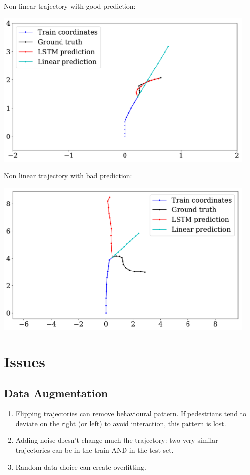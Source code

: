 \documentclass[a0,portrait]{a0poster}
\begin{document}
\begin{multicols}{2}
\begin{minipage}[]{0.5\linewidth}
Non linear trajectory with good prediction:\\
\centerline {\includegraphics[width=0.95\textwidth]{figure/fig_1552}}
\end{minipage}
\hfill
\begin{minipage}[]{0.5\linewidth}
Non linear trajectory with bad prediction:\\
\centerline {\includegraphics[width=0.95\textwidth]{figure/fig_1621}}
\end{minipage}


\section*{Issues}

\subsection*{Data Augmentation}
\begin{enumerate}
\justifying
\item Flipping trajectories can remove behavioural pattern. If pedestrians tend to deviate on the right (or left) to avoid interaction, this pattern is lost. 
\item Adding noise doesn't change much the trajectory: two very similar trajectories can be in the train AND in the test set.
\item Random data choice can create overfitting.
\end{enumerate}

\end{multicols}
\end{document}
